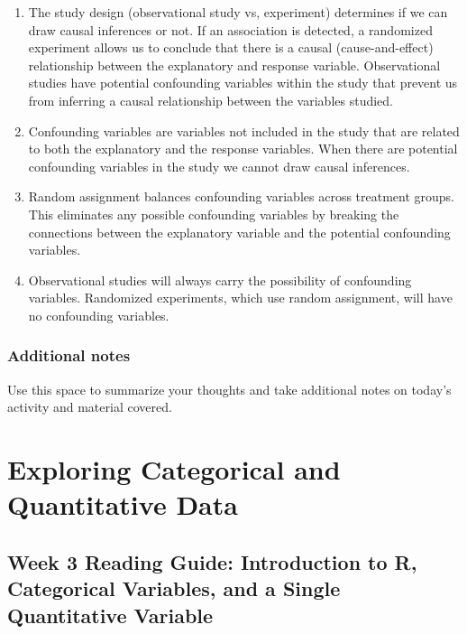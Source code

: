 \documentclass[
]{report}
\begin{document}
\begin{enumerate}
\def\labelenumi{\arabic{enumi}.}
\item
  The study design (observational study vs, experiment) determines if we can draw causal inferences or not. If an association is detected, a randomized experiment allows us to conclude that there is a causal (cause-and-effect) relationship between the explanatory and response variable. Observational studies have potential confounding variables within the study that prevent us from inferring a causal relationship between the variables studied.
\item
  Confounding variables are variables not included in the study that are related to both the explanatory and the response variables. When there are potential confounding variables in the study we cannot draw causal inferences.
\item
  Random assignment balances confounding variables across treatment groups. This eliminates any possible confounding variables by breaking the connections between the explanatory variable and the potential confounding variables.
\item
  Observational studies will always carry the possibility of confounding variables. Randomized experiments, which use random assignment, will have no confounding variables.
\end{enumerate}

\newpage

\hypertarget{additional-notes-3}{%
\subsection{Additional notes}\label{additional-notes-3}}

Use this space to summarize your thoughts and take additional notes on today's activity and material covered.

\newpage

\hypertarget{exploring-categorical-and-quantitative-data}{%
\chapter{Exploring Categorical and Quantitative Data}\label{exploring-categorical-and-quantitative-data}}

\hypertarget{week-3-reading-guide-introduction-to-r-categorical-variables-and-a-single-quantitative-variable}{%
\section{Week 3 Reading Guide: Introduction to R, Categorical Variables, and a Single Quantitative Variable}\label{week-3-reading-guide-introduction-to-r-categorical-variables-and-a-single-quantitative-variable}}
\end{document}
